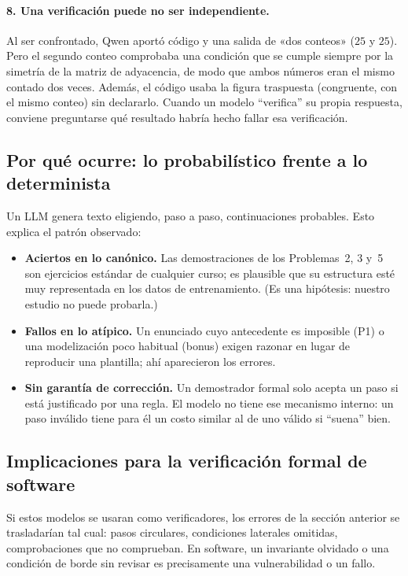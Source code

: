 \documentclass[11pt]{article}
\begin{document}
\paragraph{8. Una verificación puede no ser independiente.}
Al ser confrontado, Qwen aportó código y una salida de «dos conteos» ($25$ y $25$). Pero el segundo conteo comprobaba una condición que se cumple siempre por la simetría de la matriz de adyacencia, de modo que ambos números eran el mismo contado dos veces. Además, el código usaba la figura traspuesta (congruente, con el mismo conteo) sin declararlo. Cuando un modelo ``verifica'' su propia respuesta, conviene preguntarse qué resultado habría hecho fallar esa verificación.

\subsection{Por qué ocurre: lo probabilístico frente a lo determinista}

Un LLM genera texto eligiendo, paso a paso, continuaciones probables. Esto explica el patrón observado:

\begin{itemize}
\item \textbf{Aciertos en lo canónico.} Las demostraciones de los Problemas~2, 3 y~5 son ejercicios estándar de cualquier curso; es plausible que su estructura esté muy representada en los datos de entrenamiento. (Es una hipótesis: nuestro estudio no puede probarla.)
\item \textbf{Fallos en lo atípico.} Un enunciado cuyo antecedente es imposible (P1) o una modelización poco habitual (bonus) exigen razonar en lugar de reproducir una plantilla; ahí aparecieron los errores.
\item \textbf{Sin garantía de corrección.} Un demostrador formal solo acepta un paso si está justificado por una regla. El modelo no tiene ese mecanismo interno: un paso inválido tiene para él un costo similar al de uno válido si ``suena'' bien.
\end{itemize}

\subsection{Implicaciones para la verificación formal de software}

Si estos modelos se usaran como verificadores, los errores de la sección anterior se trasladarían tal cual: pasos circulares, condiciones laterales omitidas, comprobaciones que no comprueban. En software, un invariante olvidado o una condición de borde sin revisar es precisamente una vulnerabilidad o un fallo.
\end{document}
